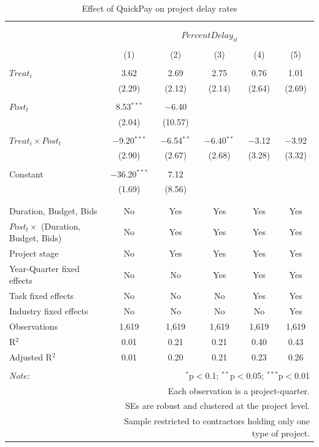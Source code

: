 \documentclass[
]{article}
\begin{document}
\begin{table}[H] \centering 
  \caption{Effect of QuickPay on project delay rates} 
  \label{} 
\small 
\begin{tabular}{@{\extracolsep{-2pt}}lccccc} 
\\[-1.8ex]\hline 
\hline \\[-1.8ex] 
\\[-1.8ex] & \multicolumn{5}{c}{$PercentDelay_{it}$} \\ 
\\[-1.8ex] & (1) & (2) & (3) & (4) & (5)\\ 
\hline \\[-1.8ex] 
 $Treat_i$ & 3.62 & 2.69 & 2.75 & 0.76 & 1.01 \\ 
  & (2.29) & (2.12) & (2.14) & (2.64) & (2.69) \\ 
  & & & & & \\ 
 $Post_t$ & 8.53$^{***}$ & $-$6.40 &  &  &  \\ 
  & (2.04) & (10.57) &  &  &  \\ 
  & & & & & \\ 
 $Treat_i \times Post_t$ & $-$9.20$^{***}$ & $-$6.54$^{**}$ & $-$6.40$^{**}$ & $-$3.12 & $-$3.92 \\ 
  & (2.90) & (2.67) & (2.68) & (3.28) & (3.32) \\ 
  & & & & & \\ 
 Constant & $-$36.20$^{***}$ & 7.12 &  &  &  \\ 
  & (1.69) & (8.56) &  &  &  \\ 
  & & & & & \\ 
\hline \\[-1.8ex] 
Duration, Budget, Bids & No & Yes & Yes & Yes & Yes \\ 
$Post_t \times$  (Duration, Budget, Bids) & No & Yes & Yes & Yes & Yes \\ 
Project stage & No & Yes & Yes & Yes & Yes \\ 
Year-Quarter fixed effects & No & No & Yes & Yes & Yes \\ 
Task fixed effects & No & No & No & Yes & Yes \\ 
Industry fixed effects & No & No & No & No & Yes \\ 
Observations & 1,619 & 1,619 & 1,619 & 1,619 & 1,619 \\ 
R$^{2}$ & 0.01 & 0.21 & 0.21 & 0.40 & 0.43 \\ 
Adjusted R$^{2}$ & 0.01 & 0.20 & 0.21 & 0.23 & 0.26 \\ 
\hline 
\hline \\[-1.8ex] 
\textit{Note:}  & \multicolumn{5}{r}{$^{*}$p$<$0.1; $^{**}$p$<$0.05; $^{***}$p$<$0.01} \\ 
 & \multicolumn{5}{r}{Each observation is a project-quarter.} \\ 
 & \multicolumn{5}{r}{SEs are robust and clustered at the project level.} \\ 
 & \multicolumn{5}{r}{Sample restricted to contractors holding only one type of project.} \\ 
\end{tabular} 
\end{table}
\end{document}
